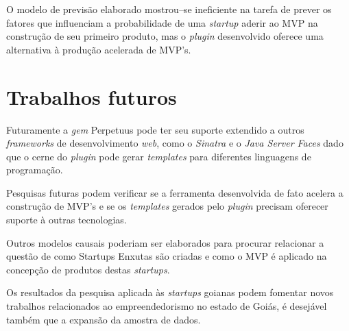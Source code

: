 O modelo de previs\~ao elaborado mostrou--se ineficiente na tarefa de prever os fatores que influenciam a probabilidade de uma \emph{startup} aderir ao MVP na constru\c{c}\~ao de seu primeiro produto, mas o \emph{plugin} desenvolvido oferece uma alternativa \`a produ\c{c}\~ao acelerada de MVP's.

\section{Trabalhos futuros}

Futuramente a \emph{gem} Perpetuus pode ter seu suporte extendido a outros \emph{frameworks} de desenvolvimento \emph{web}, como o \emph{Sinatra} e o \emph{Java Server Faces} dado que o cerne do \emph{plugin} pode gerar \emph{templates} para diferentes linguagens de programa\c{c}\~ao.

Pesquisas futuras podem verificar se a ferramenta desenvolvida de fato acelera a constru\c{c}\~ao de MVP's e se os \emph{templates} gerados pelo \emph{plugin} precisam oferecer suporte \`a outras tecnologias.

Outros modelos causais poderiam ser elaborados para procurar relacionar a quest\~ao de como Startups Enxutas s\~ao criadas e como o MVP \'e aplicado na concep\c{c}\~ao de produtos destas \emph{startups}.

Os resultados da pesquisa aplicada \`as \emph{startups} goianas podem fomentar novos trabalhos relacionados ao empreendedorismo no estado de Goi\'as, \'e desej\'avel tamb\'em que a expans\~ao da amostra de dados.